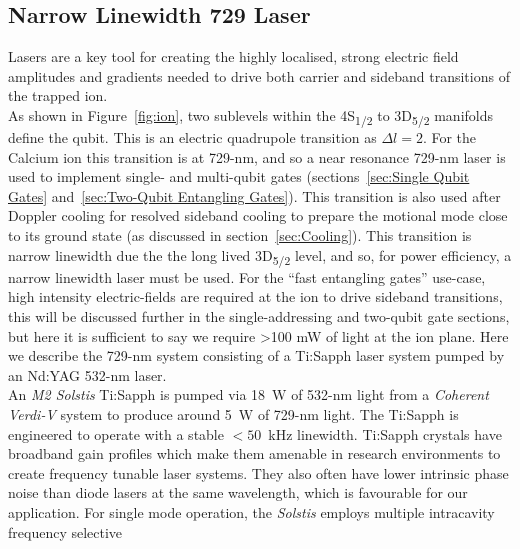 \subsection{Narrow Linewidth 729 Laser}
\label{sec:Narrow Linewidth 729 Laser} 
    Lasers are a key tool for creating the highly localised, strong electric
    field amplitudes and gradients needed to drive both carrier and sideband
    transitions of the trapped ion.\\
    As shown in Figure~\ref{fig:ion}, 
    two sublevels within the 4S\textsubscript{1/2} to 3D\textsubscript{5/2}
    manifolds define the qubit. This is an electric quadrupole transition as
    $\Delta l = 2$.  For the Calcium ion this transition is at 729-nm, and so 
    a near resonance 729-nm laser is used to implement single- and multi-qubit gates
    (sections~\ref{sec:Single Qubit Gates} and~\ref{sec:Two-Qubit
    Entangling Gates}). This transition is also used after Doppler cooling for
    resolved sideband cooling to prepare the motional mode close to its ground
    state (as discussed in section~\ref{sec:Cooling}).
    This transition is narrow linewidth due the the long lived
    3D\textsubscript{5/2} level, and so, for power efficiency, a
    narrow linewidth laser must be used. For the ``fast entangling gates'' use-case, high intensity electric-fields are required at the ion to drive sideband
    transitions, this will be discussed further in the single-addressing and
    two-qubit gate sections, but here it is sufficient to say we require >100 mW
    of light at the ion plane.  Here we describe the 729-nm system 
    consisting of a Ti:Sapph laser system pumped by an Nd:YAG 532-nm laser.\\
    An \emph{M2 Solstis} Ti:Sapph is pumped via 18~W of 532-nm light
    from a \emph{Coherent Verdi-V} system to produce around 5~W of
    729-nm light.  The Ti:Sapph is engineered to operate with a stable $<50$~kHz
    linewidth. Ti:Sapph crystals have broadband gain profiles which
    make them amenable in research environments to create frequency tunable
    laser systems. They also often have lower intrinsic phase noise than diode lasers at the same wavelength, which is favourable for our application.
    For single mode operation, the \emph{Solstis} employs multiple intracavity frequency selective
